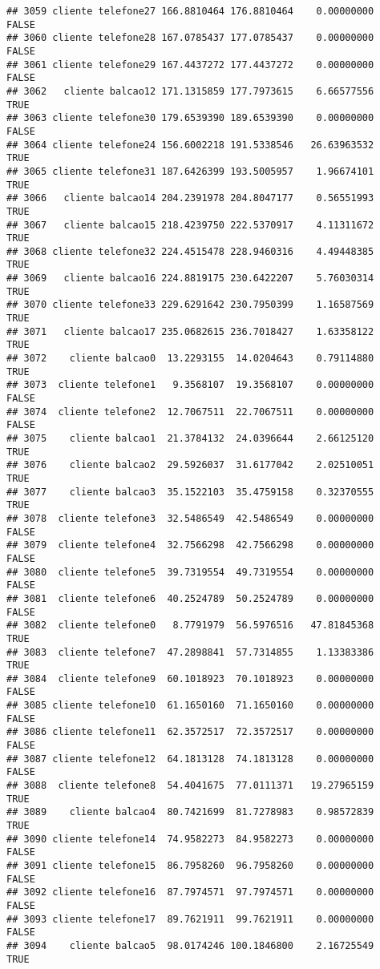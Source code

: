 \documentclass[
]{article}
\begin{document}
\begin{verbatim}
## 3059 cliente telefone27 166.8810464 176.8810464    0.00000000    FALSE
## 3060 cliente telefone28 167.0785437 177.0785437    0.00000000    FALSE
## 3061 cliente telefone29 167.4437272 177.4437272    0.00000000    FALSE
## 3062   cliente balcao12 171.1315859 177.7973615    6.66577556     TRUE
## 3063 cliente telefone30 179.6539390 189.6539390    0.00000000    FALSE
## 3064 cliente telefone24 156.6002218 191.5338546   26.63963532     TRUE
## 3065 cliente telefone31 187.6426399 193.5005957    1.96674101     TRUE
## 3066   cliente balcao14 204.2391978 204.8047177    0.56551993     TRUE
## 3067   cliente balcao15 218.4239750 222.5370917    4.11311672     TRUE
## 3068 cliente telefone32 224.4515478 228.9460316    4.49448385     TRUE
## 3069   cliente balcao16 224.8819175 230.6422207    5.76030314     TRUE
## 3070 cliente telefone33 229.6291642 230.7950399    1.16587569     TRUE
## 3071   cliente balcao17 235.0682615 236.7018427    1.63358122     TRUE
## 3072    cliente balcao0  13.2293155  14.0204643    0.79114880     TRUE
## 3073  cliente telefone1   9.3568107  19.3568107    0.00000000    FALSE
## 3074  cliente telefone2  12.7067511  22.7067511    0.00000000    FALSE
## 3075    cliente balcao1  21.3784132  24.0396644    2.66125120     TRUE
## 3076    cliente balcao2  29.5926037  31.6177042    2.02510051     TRUE
## 3077    cliente balcao3  35.1522103  35.4759158    0.32370555     TRUE
## 3078  cliente telefone3  32.5486549  42.5486549    0.00000000    FALSE
## 3079  cliente telefone4  32.7566298  42.7566298    0.00000000    FALSE
## 3080  cliente telefone5  39.7319554  49.7319554    0.00000000    FALSE
## 3081  cliente telefone6  40.2524789  50.2524789    0.00000000    FALSE
## 3082  cliente telefone0   8.7791979  56.5976516   47.81845368     TRUE
## 3083  cliente telefone7  47.2898841  57.7314855    1.13383386     TRUE
## 3084  cliente telefone9  60.1018923  70.1018923    0.00000000    FALSE
## 3085 cliente telefone10  61.1650160  71.1650160    0.00000000    FALSE
## 3086 cliente telefone11  62.3572517  72.3572517    0.00000000    FALSE
## 3087 cliente telefone12  64.1813128  74.1813128    0.00000000    FALSE
## 3088  cliente telefone8  54.4041675  77.0111371   19.27965159     TRUE
## 3089    cliente balcao4  80.7421699  81.7278983    0.98572839     TRUE
## 3090 cliente telefone14  74.9582273  84.9582273    0.00000000    FALSE
## 3091 cliente telefone15  86.7958260  96.7958260    0.00000000    FALSE
## 3092 cliente telefone16  87.7974571  97.7974571    0.00000000    FALSE
## 3093 cliente telefone17  89.7621911  99.7621911    0.00000000    FALSE
## 3094    cliente balcao5  98.0174246 100.1846800    2.16725549     TRUE

\end{verbatim}
\end{document}
